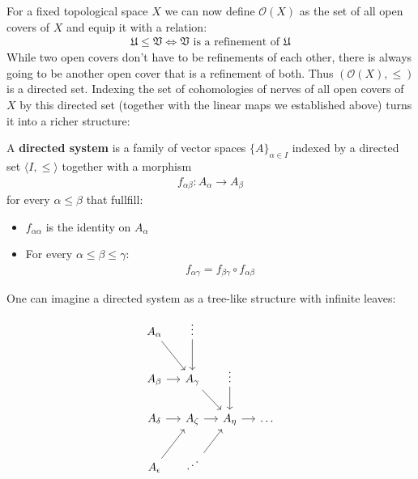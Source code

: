 For a fixed topological space $X$ we can now define $\mathcal{O}(X)$ as the set of all open
covers of $X$ and equip it with a relation:
\begin{align*}
	\mathfrak{U} \leqslant \mathfrak{V}
		\iff
	\mathfrak{V} \text{ is a refinement of } \mathfrak{U}
\end{align*}
While two open covers don't have to be refinements of each other, there is always going
to be another open cover that is a refinement of both. Thus $(\mathcal{O}(X), \leqslant)$ 
is a directed set. Indexing the set of cohomologies of nerves of all open covers of $X$
by this directed set (together with the linear maps we established above) turns it into a
richer structure:
\begin{definition}
A \textbf{directed system} is a family of vector spaces $\{A\}_{\alpha \in I}$ indexed by a
directed set $\langle I, \leqslant \rangle$ together with a morphism
\begin{align*}
	f_{\alpha \beta}: A_\alpha \to A_\beta
\end{align*}
for every $\alpha \leqslant \beta$ that fullfill:
\begin{itemize}
	\item $f_{\alpha \alpha}$ is the identity on $A_\alpha$
	\item For every $\alpha \leqslant \beta \leqslant \gamma$:
		\begin{align*}
			f_{\alpha \gamma} = f_{\beta \gamma} \circ f_{\alpha \beta}
		\end{align*}
\end{itemize}
\end{definition}
One can imagine a directed system as a tree-like structure with infinite leaves:
\[\begin{tikzcd}[column sep=small]
	{A_{\alpha}} & \vdots \\
	{A_\beta} & {A_\gamma} & \vdots \\
	{A_\delta} & {A_\zeta} & {A_\eta} & \dots \\
	{A_\epsilon} & \iddots
	\arrow[from=1-1, to=2-2]
	\arrow[from=1-2, to=2-2]
	\arrow[from=2-1, to=2-2]
	\arrow[from=2-2, to=3-3]
	\arrow[from=2-3, to=3-3]
	\arrow[from=3-1, to=3-2]
	\arrow[from=3-2, to=3-3]
	\arrow[from=3-3, to=3-4]
	\arrow[from=4-1, to=3-2]
	\arrow[from=4-2, to=3-3]
\end{tikzcd}\]
